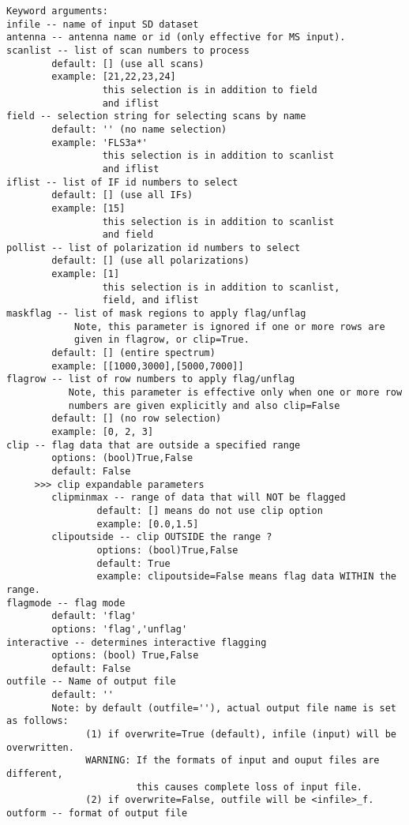 \begin{verbatim}
Keyword arguments:
infile -- name of input SD dataset
antenna -- antenna name or id (only effective for MS input). 
scanlist -- list of scan numbers to process
        default: [] (use all scans)
        example: [21,22,23,24]
                 this selection is in addition to field
                 and iflist
field -- selection string for selecting scans by name
        default: '' (no name selection)
        example: 'FLS3a*'
                 this selection is in addition to scanlist
                 and iflist
iflist -- list of IF id numbers to select
        default: [] (use all IFs)
        example: [15]
                 this selection is in addition to scanlist
                 and field
pollist -- list of polarization id numbers to select
        default: [] (use all polarizations)
        example: [1]
                 this selection is in addition to scanlist,
                 field, and iflist
maskflag -- list of mask regions to apply flag/unflag 
            Note, this parameter is ignored if one or more rows are 
            given in flagrow, or clip=True.
        default: [] (entire spectrum)
        example: [[1000,3000],[5000,7000]]
flagrow -- list of row numbers to apply flag/unflag
           Note, this parameter is effective only when one or more row 
           numbers are given explicitly and also clip=False
        default: [] (no row selection)
        example: [0, 2, 3]
clip -- flag data that are outside a specified range
        options: (bool)True,False
        default: False
     >>> clip expandable parameters
        clipminmax -- range of data that will NOT be flagged
                default: [] means do not use clip option
                example: [0.0,1.5]
        clipoutside -- clip OUTSIDE the range ?
                options: (bool)True,False
                default: True
                example: clipoutside=False means flag data WITHIN the range.
flagmode -- flag mode
        default: 'flag'
        options: 'flag','unflag'
interactive -- determines interactive flagging
        options: (bool) True,False
        default: False
outfile -- Name of output file
        default: ''
        Note: by default (outfile=''), actual output file name is set as follows: 
              (1) if overwrite=True (default), infile (input) will be overwritten.
              WARNING: If the formats of input and ouput files are different, 
                       this causes complete loss of input file.
              (2) if overwrite=False, outfile will be <infile>_f. 
outform -- format of output file

\end{verbatim}
